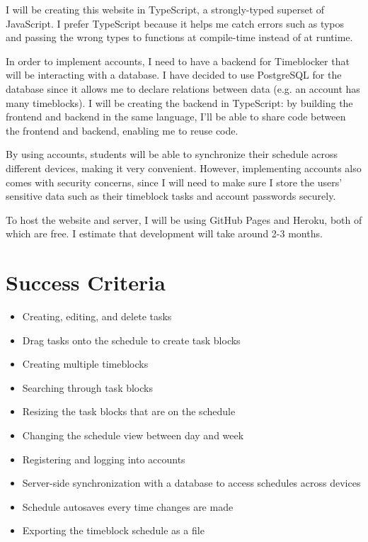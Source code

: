 \documentclass[12pt, notitlepage]{article}
\begin{document}
I will be creating this website in TypeScript, a strongly-typed superset of JavaScript. I prefer TypeScript because it helps me catch errors such as typos and passing the wrong types to functions at compile-time instead of at runtime.

In order to implement accounts, I need to have a backend for Timeblocker that will be interacting with a database. I have decided to use PostgreSQL for the database since it allows me to declare relations between data (e.g. an account has many timeblocks). I will be creating the backend in TypeScript: by building the frontend and backend in the same language, I'll be able to share code between the frontend and backend, enabling me to reuse code.

By using accounts, students will be able to synchronize their schedule across different devices, making it very convenient. However, implementing accounts also comes with security concerns, since I will need to make sure I store the users' sensitive data such as their timeblock tasks and account passwords securely.

To host the website and server, I will be using GitHub Pages and Heroku, both of which are free. I estimate that development will take around 2-3 months.

\bigskip
{}

\section{Success Criteria}
\begin{itemize}
	\item Creating, editing, and delete tasks
	\item Drag tasks onto the schedule to create task blocks
	\item Creating multiple timeblocks
	\item Searching through task blocks
	\item Resizing the task blocks that are on the schedule
	\item Changing the schedule view between day and week
	\item Registering and logging into accounts
	\item Server-side synchronization with a database to access schedules across devices
	\item Schedule autosaves every time changes are made
	\item Exporting the timeblock schedule as a file
\end{itemize}
\end{document}
